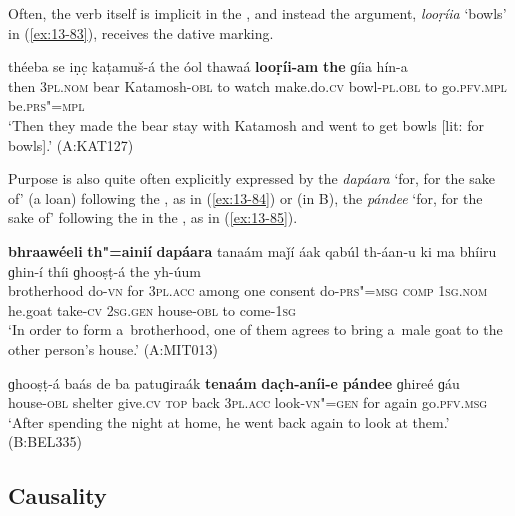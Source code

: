 Often, the verb itself is implicit in the  , and instead the  argument, \textit{looṛíia} `bowls' in (\ref{ex:13-83}), receives the dative marking.

\begin{exe}
\ex
\label{ex:13-83}
\gll théeba se iṇc̣ kaṭamuš-á the óol thawaá \textbf{looṛíi-am} \textbf{the} ɡíia hín-a \\
then \textsc{3pl.nom} bear Katamosh-\textsc{obl} to watch  make.do.\textsc{cv} bowl-\textsc{pl.obl} to go.\textsc{pfv.mpl} be.\textsc{prs"=mpl} \\
\glt `Then they made the bear stay with Katamosh and went to get bowls [lit: for bowls].' (A:KAT127) 
\end{exe}

Purpose is also quite often explicitly expressed by the  \textit{dapáara} `for, for the sake of' (a \iliPashto loan) following the , as in (\ref{ex:13-84}) or (in B), the  \textit{pándee} `for, for the sake of' following the  in the , as in (\ref{ex:13-85}).

\begin{exe}
\ex
\label{ex:13-84}
\gll \textbf{bhraawéeli} \textbf{th"=ainií} \textbf{dapáara} tanaám maǰí áak qabúl th-áan-u ki ma bhíiru ɡhin-í thíi ɡhooṣṭ-á the yh-úum \\
brotherhood do-\textsc{vn} for \textsc{3pl.acc} among one consent do-\textsc{prs"=msg} \textsc{comp} \textsc{1sg.nom} he.goat take-\textsc{cv} \textsc{2sg.gen}  house-\textsc{obl} to come-\textsc{1sg} \\
\glt `In order to form a~brotherhood, one of them agrees to bring a~male goat to the other person's house.' (A:MIT013)

\ex
\label{ex:13-85}
\gll ɡhooṣṭ-á baás de ba patuɡiraák \textbf{tenaám} \textbf{dac̣h-aníi-e} \textbf{pándee} ɡhireé ɡáu \\
house-\textsc{obl}  shelter give.\textsc{cv} \textsc{top} back \textsc{3pl.acc}  look-\textsc{vn"=gen} for again go.\textsc{pfv.msg} \\
\glt `After spending the night at home, he went back again to look at them.' (B:BEL335)
\end{exe}

\subsection{Causality}
\label{subsec:13-4-3}

